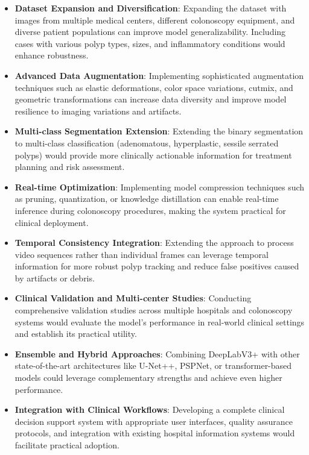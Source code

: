 \documentclass[a4paper,12pt]{report}
\begin{document}
\begin{itemize}
    \item \textbf{Dataset Expansion and Diversification}: Expanding the dataset with images from multiple medical centers, different colonoscopy equipment, and diverse patient populations can improve model generalizability. Including cases with various polyp types, sizes, and inflammatory conditions would enhance robustness.
    \item \textbf{Advanced Data Augmentation}: Implementing sophisticated augmentation techniques such as elastic deformations, color space variations, cutmix, and geometric transformations can increase data diversity and improve model resilience to imaging variations and artifacts.
    \item \textbf{Multi-class Segmentation Extension}: Extending the binary segmentation to multi-class classification (adenomatous, hyperplastic, sessile serrated polyps) would provide more clinically actionable information for treatment planning and risk assessment.
    \item \textbf{Real-time Optimization}: Implementing model compression techniques such as pruning, quantization, or knowledge distillation can enable real-time inference during colonoscopy procedures, making the system practical for clinical deployment.
    \item \textbf{Temporal Consistency Integration}: Extending the approach to process video sequences rather than individual frames can leverage temporal information for more robust polyp tracking and reduce false positives caused by artifacts or debris.
    \item \textbf{Clinical Validation and Multi-center Studies}: Conducting comprehensive validation studies across multiple hospitals and colonoscopy systems would evaluate the model's performance in real-world clinical settings and establish its practical utility.
    \item \textbf{Ensemble and Hybrid Approaches}: Combining DeepLabV3+ with other state-of-the-art architectures like U-Net++, PSPNet, or transformer-based models could leverage complementary strengths and achieve even higher performance.
    \item \textbf{Integration with Clinical Workflows}: Developing a complete clinical decision support system with appropriate user interfaces, quality assurance protocols, and integration with existing hospital information systems would facilitate practical adoption.
\end{itemize}
\end{document}
